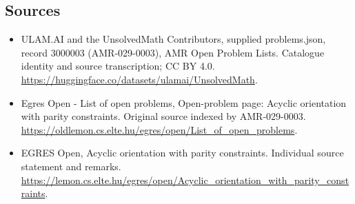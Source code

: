 \documentclass[11pt,a4paper]{article}
\begin{document}
\subsection{Sources}
\begin{itemize}
\item[S1] ULAM.AI and the UnsolvedMath Contributors, supplied problems.json, record 3000003 (AMR-029-0003), AMR Open Problem Lists. Catalogue identity and source transcription; CC BY 4.0.
\url{https://huggingface.co/datasets/ulamai/UnsolvedMath}.
\item[S2] Egres Open - List of open problems, Open-problem page: Acyclic orientation with parity constraints. Original source indexed by AMR-029-0003.
\url{https://oldlemon.cs.elte.hu/egres/open/List_of_open_problems}.
\item[S3] EGRES Open, Acyclic orientation with parity constraints. Individual source statement and remarks.
\url{https://lemon.cs.elte.hu/egres/open/Acyclic_orientation_with_parity_constraints}.
\end{itemize}
\end{document}
